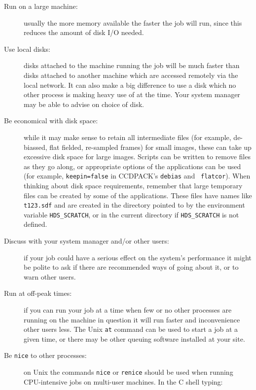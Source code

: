 \documentclass[twoside,11pt]{article}
\begin{document}
\begin{description}

  \item[Run on a large machine:] usually the more memory available the
   faster the job will run, since this reduces the amount of disk I/O needed.

  \item[Use local disks:] disks attached to the machine running the job will
   be much faster than disks attached to another machine which are accessed
   remotely via the local network.
   It can also make a big difference to use a disk which
   no other process is making heavy use of at the time.
   Your system manager may be able to advise on choice of disk.

  \item[Be economical with disk space:] while it may make sense to retain
   all intermediate files (for example, de-biassed, flat fielded, re-sampled
   frames) for small images, these can take up excessive disk space
   for large images.
   Scripts can be written to remove files as they go along,
   or appropriate options of the applications can be used
   (for example, {\tt keepin=false} in CCDPACK's {\tt debias} and {\tt
   flatcor}).
   When thinking about disk space requirements,
   remember that large temporary files can be created by
   some of the applications.
   These files have names like {\tt t123.sdf} and are created in the
   directory pointed to by the environment variable {\tt HDS\_SCRATCH},
   or in the current directory if {\tt HDS\_SCRATCH} is not defined.

  \item[Discuss with your system manager and/or other users:] if your job
   could have a serious effect on the system's performance it might be
   polite to ask if there are recommended ways of going about it, or to
   warn other users.

  \item[Run at off-peak times:] if you can run your job at a time when few
   or no other processes are running on the machine in question it will
   run faster and inconvenience other users less.
   The Unix {\tt at} command can be used to start a job at a given time, or
   there may be other queuing software installed at your site.

  \item[Be {\tt nice} to other processes:] on Unix the commands {\tt nice}
   or {\tt renice} should be used when running CPU-intensive jobs on
   multi-user machines.
   In the C shell typing:


\end{description}
\end{document}
